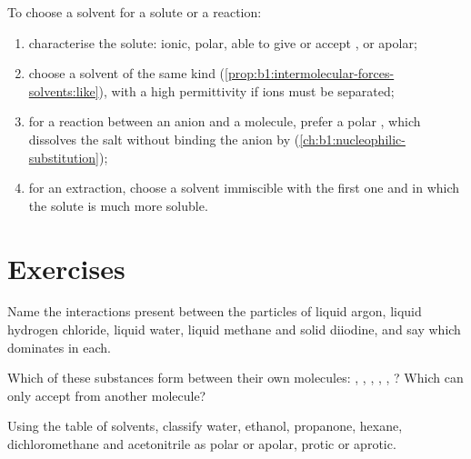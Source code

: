 \begin{method}\label{met:b1:intermolecular-forces-solvents:choose}
To choose a solvent for a solute or a reaction:
\begin{enumerate}
  \item characterise the solute: ionic, polar, able to give or accept
        , or apolar;
  \item choose a solvent of the same kind (\cref{prop:b1:intermolecular-forces-solvents:like}),
        with a high permittivity if ions must be separated;
  \item for a reaction between an anion and a molecule, prefer a polar
        , which dissolves the salt without binding the
        anion by  (\cref{ch:b1:nucleophilic-substitution});
  \item for an extraction, choose a solvent immiscible with the first one
        and in which the solute is much more soluble.
\end{enumerate}
\end{method}

\section{Exercises}

\begin{exercise}[$\star$]\label{exo:b1:intermolecular-forces-solvents:1}
Name the interactions present between the particles of liquid argon,
liquid hydrogen chloride, liquid water, liquid methane and solid
diiodine, and say which dominates in each.
\end{exercise}

\begin{exercise}[$\star$]\label{exo:b1:intermolecular-forces-solvents:2}
Which of these substances form  between their own
molecules: , , , , ,
? Which can only accept  from another molecule?
\end{exercise}

\begin{exercise}[$\star$]\label{exo:b1:intermolecular-forces-solvents:3}
Using the table of solvents, classify water, ethanol, propanone, hexane,
dichloromethane and acetonitrile as polar or apolar, protic or aprotic.
\end{exercise}

